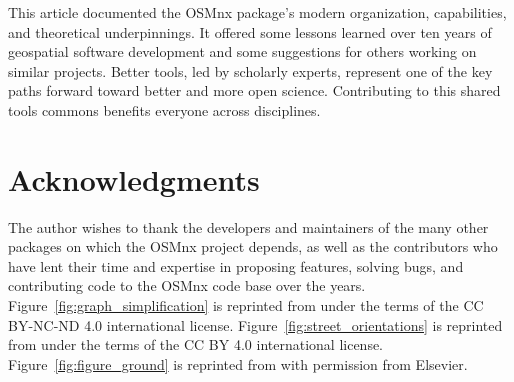 \documentclass[12pt,letterpaper]{article} %
\begin{document}
This article documented the OSMnx package's modern organization, capabilities, and theoretical underpinnings. It offered some lessons learned over ten years of geospatial software development and some suggestions for others working on similar projects. Better tools, led by scholarly experts, represent one of the key paths forward toward better and more open science. Contributing to this shared tools commons benefits everyone across disciplines.

\section*{Acknowledgments}

The author wishes to thank the developers and maintainers of the many other packages on which the OSMnx project depends, as well as the contributors who have lent their time and expertise in proposing features, solving bugs, and contributing code to the OSMnx code base over the years. Figure~\ref{fig:graph_simplification} is reprinted from \citet{boeing_graph_2025} under the terms of the CC BY-NC-ND 4.0 international license. Figure~\ref{fig:street_orientations} is reprinted from \citet{barthelemy_review_2024} under the terms of the CC BY 4.0 international license. Figure~\ref{fig:figure_ground} is reprinted from \citet{boeing_spatial_2021} with permission from Elsevier.


\setlength{\bibsep}{0.00cm plus 0.05cm} %


\end{document}
